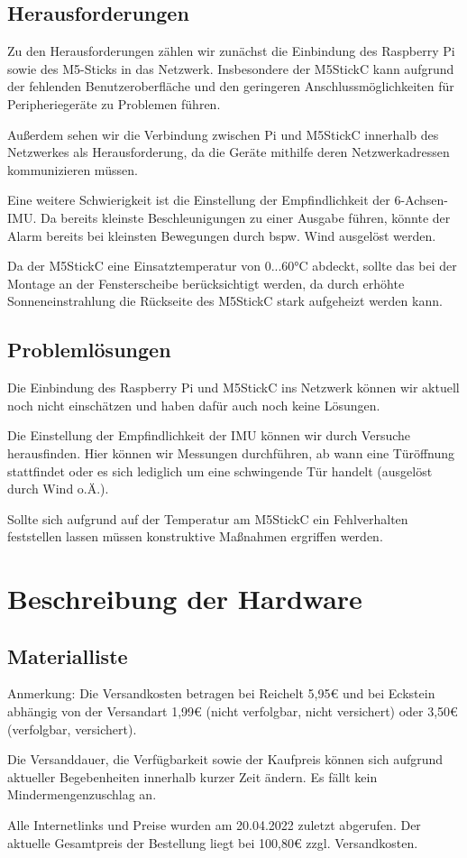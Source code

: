 \documentclass[a4paper,12pt]{article}
\begin{document}
\subsection{Herausforderungen}
Zu den Herausforderungen zählen wir zunächst die Einbindung des Raspberry Pi sowie des M5-Sticks in das Netzwerk. Insbesondere der M5StickC kann aufgrund der fehlenden Benutzeroberfläche und den geringeren Anschlussmöglichkeiten für Peripheriegeräte zu Problemen führen.\par
Außerdem sehen wir die Verbindung zwischen Pi und M5StickC innerhalb des Netzwerkes als Herausforderung, da die Geräte mithilfe deren Netzwerkadressen kommunizieren müssen.\par 
Eine weitere Schwierigkeit ist die Einstellung der Empfindlichkeit der 6-Achsen-IMU. Da bereits kleinste Beschleunigungen zu einer Ausgabe führen, könnte der Alarm bereits bei kleinsten Bewegungen durch bspw. Wind ausgelöst werden.\par 
Da der M5StickC eine Einsatztemperatur von 0...60°C abdeckt, sollte das bei der Montage an der Fensterscheibe berücksichtigt werden, da durch erhöhte Sonneneinstrahlung die Rückseite des M5StickC stark aufgeheizt werden kann. 

\subsection{Problemlösungen}
Die Einbindung des Raspberry Pi und M5StickC ins Netzwerk können wir aktuell noch nicht einschätzen und haben dafür auch noch keine Lösungen.\par 
Die Einstellung der Empfindlichkeit der IMU können wir durch Versuche herausfinden. Hier können wir Messungen durchführen, ab wann eine Türöffnung stattfindet oder es sich lediglich um eine schwingende Tür handelt (ausgelöst durch Wind o.Ä.).\par 
Sollte sich aufgrund auf der Temperatur am M5StickC ein Fehlverhalten feststellen lassen müssen konstruktive Maßnahmen ergriffen werden.

\section{Beschreibung der Hardware}
\subsection{Materialliste}
Anmerkung: Die Versandkosten betragen bei Reichelt 5,95€ und bei Eckstein abhängig von der Versandart 1,99€ (nicht verfolgbar, nicht versichert) oder 3,50€ (verfolgbar, versichert).\par Die Versanddauer, die Verfügbarkeit sowie der Kaufpreis können sich aufgrund aktueller Begebenheiten innerhalb kurzer Zeit ändern. Es fällt kein Mindermengenzuschlag an.\par 
Alle Internetlinks und Preise wurden am 20.04.2022 zuletzt abgerufen. Der aktuelle Gesamtpreis der Bestellung liegt bei 100,80€ zzgl. Versandkosten.
\end{document}
